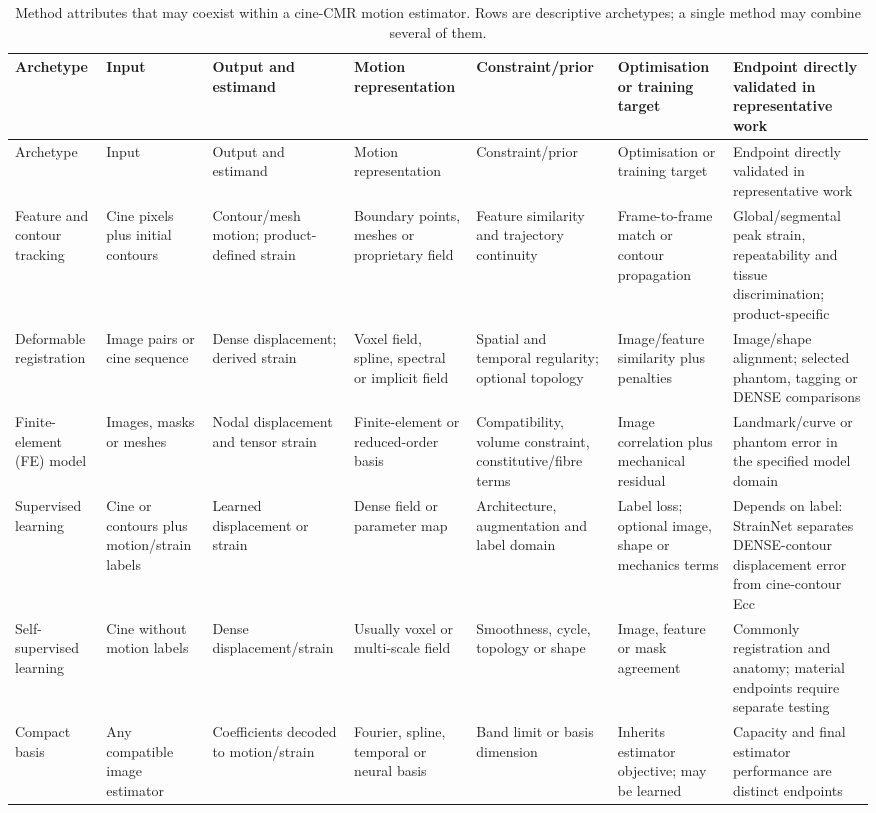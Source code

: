 {\scriptsize\sloppy
\setlength{\tabcolsep}{2pt}
\begin{longtable}{L{0.09\textwidth}L{0.115\textwidth}L{0.11\textwidth}L{0.105\textwidth}L{0.115\textwidth}L{0.11\textwidth}L{0.145\textwidth}}
\caption{Method attributes that may coexist within a cine-CMR motion estimator. Rows are descriptive archetypes; a single method may combine several of them.}\label{tab:families}\\
\toprule
Archetype & Input & Output and estimand & Motion representation & Constraint/prior & Optimisation or training target & Endpoint directly validated in representative work \\
\midrule
\endfirsthead
\toprule
Archetype & Input & Output and estimand & Motion representation & Constraint/prior & Optimisation or training target & Endpoint directly validated in representative work \\
\midrule
\endhead
Feature and contour tracking & Cine pixels plus initial contours & Contour/mesh motion; product-defined strain & Boundary points, meshes or proprietary field & Feature similarity and trajectory continuity & Frame-to-frame match or contour propagation & Global/segmental peak strain, repeatability and tissue discrimination; product-specific \\
\addlinespace
Deformable registration & Image pairs or cine sequence & Dense displacement; derived strain & Voxel field, spline, spectral or implicit field & Spatial and temporal regularity; optional topology & Image/feature similarity plus penalties & Image/shape alignment; selected phantom, tagging or DENSE comparisons \\
\addlinespace
Finite-element (FE) model & Images, masks or meshes & Nodal displacement and tensor strain & Finite-element or reduced-order basis & Compatibility, volume constraint, constitutive/fibre terms & Image correlation plus mechanical residual & Landmark/curve or phantom error in the specified model domain \\
\addlinespace
Supervised learning & Cine or contours plus motion/strain labels & Learned displacement or strain & Dense field or parameter map & Architecture, augmentation and label domain & Label loss; optional image, shape or mechanics terms & Depends on label: StrainNet separates DENSE-contour displacement error from cine-contour Ecc \\
\addlinespace
Self-supervised learning & Cine without motion labels & Dense displacement/strain & Usually voxel or multi-scale field & Smoothness, cycle, topology or shape & Image, feature or mask agreement & Commonly registration and anatomy; material endpoints require separate testing \\
\addlinespace
Compact basis & Any compatible image estimator & Coefficients decoded to motion/strain & Fourier, spline, temporal or neural basis & Band limit or basis dimension & Inherits estimator objective; may be learned & Capacity and final estimator performance are distinct endpoints \\
\bottomrule
\end{longtable}
}

